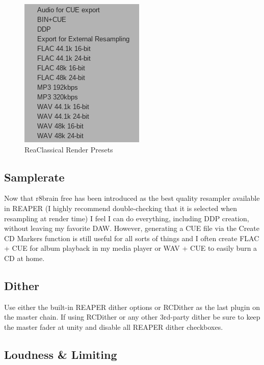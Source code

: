 \documentclass[10pt,american]{article}
\begin{document}
\begin{figure}
\begin{centering}
\includegraphics[scale=0.75]{user_guide_images/render_presets}
\par\end{centering}
\caption{ReaClassical Render Presets}

\end{figure}


\subsection{Samplerate}

Now that r8brain free has been introduced as the best quality resampler
available in REAPER (I highly recommend double-checking that it is selected when
resampling at render time) I feel I can do everything, including DDP creation,
without leaving my favorite DAW. However, generating a CUE file via the Create
CD Markers function is still useful for all sorts of things and I often create
FLAC + CUE for album playback in my media player or WAV + CUE to easily burn a
CD at home.

\subsection{Dither}

Use either the built-in REAPER dither options or RCDither as the last plugin on
the master chain. If using RCDither or any other 3rd-party dither be sure to
keep the master fader at unity and disable all REAPER dither checkboxes.

\subsection{Loudness \& Limiting}
\end{document}
